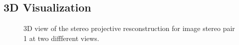 \documentclass{article}
\begin{document}
\subsection{3D Visualization}
\begin{figure}[!htbp]
     \centering
     \captionsetup[subfigure]{labelformat=empty}
    \caption{3D view of the stereo projective resconstruction for image stereo pair 1 at two diffferent views.}
    \label{fig:3D_vis_1}
\end{figure}
\end{document}
